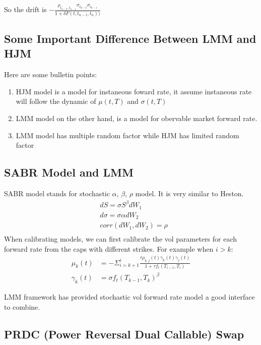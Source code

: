 So the drift is $ -\frac{\rho_{t_{n-2}, t_{n-1}}\sigma_{t_{n-2}}\sigma_{t_{n-1}}}{1 + \delta F(t, t_{n-1}, t_{n}))} $

\subsection{Some Important Difference Between LMM and HJM}
Here are some bulletin points:
\begin{enumerate}
  \item HJM model is a model for instaneous foward rate, it assume instaneous rate will follow the dynamic of $\mu(t, T)$ and $\sigma(t, T)$
  \item LMM model on the other hand, is a model for obervable market forward rate.
  \item LMM model has multiple random factor while HJM has limited random factor
\end{enumerate}

\subsection{SABR Model and LMM}
SABR model stands for stochastic $\alpha$, $\beta$, $\rho$ model. It is very similar to Heston.
\begin{equation}
\begin{aligned}
& dS = \sigma S^{\beta} dW_1\\
& d\sigma = \sigma \alpha dW_2\\
& corr(dW_1, dW_2) = \rho\\
\end{aligned}
\end{equation}
When calibrating models, we can first calibrate the vol parameters for each forward rate from the caps with different strikes.
For example when $i > k$:
\begin{equation}
\begin{aligned}
\mu_k(t) &= - \Sigma_{i=k+1}^i\frac{\tau \rho_{k, j}(t) \gamma_k(t) \gamma_j(t)}{1 + \tau f_t(T_{i-1}, T_i)}\\
\gamma_k(t) &= \sigma f_t(T_{k-1}, T_k)^{\beta}
\end{aligned}
\end{equation}

LMM framework has provided stochastic vol forward rate model a good interface to combine.


\subsection{PRDC (Power Reversal Dual Callable) Swap}


